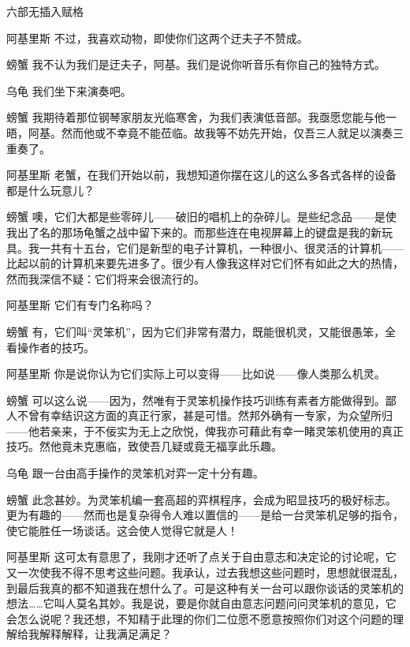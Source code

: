 \begin{dialog}{六部无插入赋格}
\begin{dialogue}
\item[阿基里斯]不过，我喜欢动物，即使你们这两个迂夫子不赞成。

\item[螃蟹]我不认为我们是迂夫子，阿基。我们是说你听音乐有你自己的独特方式。

\item[乌龟]我们坐下来演奏吧。

\item[螃蟹]我期待着那位钢琴家朋友光临寒舍，为我们表演低音部。我亟愿您能与他一晤，阿基。然而他或不幸竟不能莅临。故我等不妨先开始，仅吾三人就足以演奏三重奏了。

\item[阿基里斯]老蟹，在我们开始以前，我想知道你摆在这儿的这么多各式各样的设备都是什么玩意儿？

\item[螃蟹]噢，它们大都是些零碎儿——破旧的唱机上的杂碎儿。是些纪念品——是使我出了名的那场龟蟹之战中留下来的。而那些连在电视屏幕上的键盘是我的新玩具。我一共有十五台，它们是新型的电子计算机，一种很小、很灵活的计算机——比起以前的计算机来要先进多了。很少有人像我这样对它们怀有如此之大的热情，然而我深信不疑：它们将来会很流行的。

\item[阿基里斯]它们有专门名称吗？

\item[螃蟹]有，它们叫“灵笨机”，因为它们非常有潜力，既能很机灵，又能很愚笨，全看操作者的技巧。

\item[阿基里斯]你是说你认为它们实际上可以变得——比如说——像人类那么机灵。

\item[螃蟹]可以这么说——因为，然唯有于灵笨机操作技巧训练有素者方能做得到。鄙人不曾有幸结识这方面的真正行家，甚是可惜。然邦外确有一专家，为众望所归——他若亲来，于不佞实为无上之欣悦，俾我亦可藉此有幸一睹灵笨机使用的真正技巧。然他竟未克惠临，致使吾几疑或竟无福享此乐趣。

\item[乌龟]跟一台由高手操作的灵笨机对弈一定十分有趣。

\item[螃蟹]此念甚妙。为灵笨机编一套高超的弈棋程序，会成为昭显技巧的极好标志。更为有趣的——然而也是复杂得令人难以置信的——是给一台灵笨机足够的指令，使它能胜任一场谈话。这会使人觉得它就是人！

\item[阿基里斯]这可太有意思了，我刚才还听了点关于自由意志和决定论的讨论呢，它又一次使我不得不思考这些问题。我承认，过去我想这些问题时，思想就很混乱，到最后我真的都不知道我在想什么了。可是这种有关一台可以跟你谈话的灵笨机的想法……它叫人莫名其妙。我是说，要是你就自由意志问题问问灵笨机的意见，它会怎么说呢？我还想，不知精于此理的你们二位愿不愿意按照你们对这个问题的理解给我解释解释，让我满足满足？


\end{dialogue}
\end{dialog}
